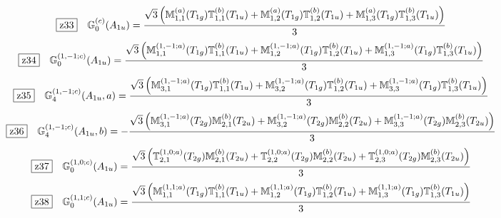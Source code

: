 \documentclass[fleqn,10pt,landscape]{jsarticle}
\begin{document}
\begin{dmath*}
\hspace*{3mm}\fbox{z33}\quad \mathbb{G}_{0}^{(c)}(A_{1u})=\frac{\sqrt{3} \left(\mathbb{M}_{1,1}^{(a)}(T_{1g}) \mathbb{T}_{1,1}^{(b)}(T_{1u}) + \mathbb{M}_{1,2}^{(a)}(T_{1g}) \mathbb{T}_{1,2}^{(b)}(T_{1u}) + \mathbb{M}_{1,3}^{(a)}(T_{1g}) \mathbb{T}_{1,3}^{(b)}(T_{1u})\right)}{3}
\end{dmath*}
\begin{dmath*}
\hspace*{3mm}\fbox{z34}\quad \mathbb{G}_{0}^{(1,-1;c)}(A_{1u})=\frac{\sqrt{3} \left(\mathbb{M}_{1,1}^{(1,-1;a)}(T_{1g}) \mathbb{T}_{1,1}^{(b)}(T_{1u}) + \mathbb{M}_{1,2}^{(1,-1;a)}(T_{1g}) \mathbb{T}_{1,2}^{(b)}(T_{1u}) + \mathbb{M}_{1,3}^{(1,-1;a)}(T_{1g}) \mathbb{T}_{1,3}^{(b)}(T_{1u})\right)}{3}
\end{dmath*}
\begin{dmath*}
\hspace*{3mm}\fbox{z35}\quad \mathbb{G}_{4}^{(1,-1;c)}(A_{1u},a)=\frac{\sqrt{3} \left(\mathbb{M}_{3,1}^{(1,-1;a)}(T_{1g}) \mathbb{T}_{1,1}^{(b)}(T_{1u}) + \mathbb{M}_{3,2}^{(1,-1;a)}(T_{1g}) \mathbb{T}_{1,2}^{(b)}(T_{1u}) + \mathbb{M}_{3,3}^{(1,-1;a)}(T_{1g}) \mathbb{T}_{1,3}^{(b)}(T_{1u})\right)}{3}
\end{dmath*}
\begin{dmath*}
\hspace*{3mm}\fbox{z36}\quad \mathbb{G}_{4}^{(1,-1;c)}(A_{1u},b)=- \frac{\sqrt{3} \left(\mathbb{M}_{3,1}^{(1,-1;a)}(T_{2g}) \mathbb{M}_{2,1}^{(b)}(T_{2u}) + \mathbb{M}_{3,2}^{(1,-1;a)}(T_{2g}) \mathbb{M}_{2,2}^{(b)}(T_{2u}) + \mathbb{M}_{3,3}^{(1,-1;a)}(T_{2g}) \mathbb{M}_{2,3}^{(b)}(T_{2u})\right)}{3}
\end{dmath*}
\begin{dmath*}
\hspace*{3mm}\fbox{z37}\quad \mathbb{G}_{0}^{(1,0;c)}(A_{1u})=\frac{\sqrt{3} \left(\mathbb{T}_{2,1}^{(1,0;a)}(T_{2g}) \mathbb{M}_{2,1}^{(b)}(T_{2u}) + \mathbb{T}_{2,2}^{(1,0;a)}(T_{2g}) \mathbb{M}_{2,2}^{(b)}(T_{2u}) + \mathbb{T}_{2,3}^{(1,0;a)}(T_{2g}) \mathbb{M}_{2,3}^{(b)}(T_{2u})\right)}{3}
\end{dmath*}
\begin{dmath*}
\hspace*{3mm}\fbox{z38}\quad \mathbb{G}_{0}^{(1,1;c)}(A_{1u})=\frac{\sqrt{3} \left(\mathbb{M}_{1,1}^{(1,1;a)}(T_{1g}) \mathbb{T}_{1,1}^{(b)}(T_{1u}) + \mathbb{M}_{1,2}^{(1,1;a)}(T_{1g}) \mathbb{T}_{1,2}^{(b)}(T_{1u}) + \mathbb{M}_{1,3}^{(1,1;a)}(T_{1g}) \mathbb{T}_{1,3}^{(b)}(T_{1u})\right)}{3}
\end{dmath*}
\end{document}
